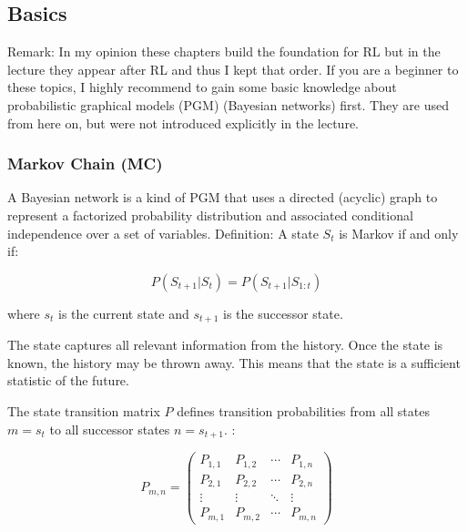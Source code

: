 \documentclass[main]{subfiles}
\begin{document}
\subsection{Basics}
Remark: In my opinion these chapters build the foundation for RL but in the lecture they appear after RL and thus I kept that order.
If you are a beginner to these topics, 
I highly recommend to gain some basic knowledge about probabilistic graphical models (PGM) (Bayesian networks) first. 
They are used from here on, but were not introduced explicitly in the lecture.

\subsubsection{Markov Chain (MC)}
A Bayesian network is a kind of PGM that uses a directed (acyclic) graph to represent a factorized probability distribution and associated conditional independence over a set of variables. 
Definition: A state $S_t$ is Markov if and only if:

\begin{equation}
    P(S_{t+1}|S_t) = P(S_{t+1} | S_{1:t})
\end{equation}

where $s_t$ is the current state and $s_{t+1}$ is the successor state.

The state captures all relevant information from the history. 
Once the state is known, the history may be thrown away. This means that the state is a sufficient statistic of the future.

The state transition matrix $P$ defines transition probabilities from all states $m = s_t$ to all successor states $n = s_{t+1}$. :

\begin{equation*}
P_{m,n} = 
\begin{pmatrix}
P_{1,1} & P_{1,2} & \cdots & P_{1,n} \\
P_{2,1} & P_{2,2} & \cdots & P_{2,n} \\
\vdots  & \vdots  & \ddots & \vdots  \\
P_{m,1} & P_{m,2} & \cdots & P_{m,n} 
\end{pmatrix}
\end{equation*}
\end{document}
